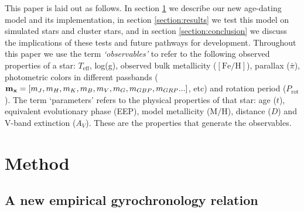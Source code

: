 \documentclass[useAMS, usenatbib, preprint, 12pt]{aastex}
\newcommand{\teff}{$T_{\mathrm{eff}}$}
\newcommand{\logg}{log(g)}
\begin{document}
This paper is laid out as follows.
In section \ref{section:method} we describe our new age-dating model and its
implementation, in section \ref{section:results} we test this model on
simulated stars and cluster stars, and in section \ref{section:conclusion} we
discuss the implications of these tests and future pathways for development.
Throughout this paper we use the term {\it `observables'} to refer to the
following observed properties of a star: \teff, \logg, observed bulk
metallicity ($[\mathrm{Fe/H}]$), parallax ($\bar{\pi}$), photometric
colors in different passbands (${\bf m_x} = [m_J, m_H, m_K, m_B, m_V, m_G,
m_{GBP}, m_{GRP}...]$, etc) and rotation period ($P_{\mathrm{rot}}$).
The term `parameters' refers to the physical properties of that star: age
($t$), equivalent evolutionary phase (EEP), model metallicity
($\mathrm{M/H}$), distance ($D$) and V-band extinction ($A_V$).
These are the properties that generate the observables.

% 

\section{Method}
\label{section:method}
\subsection{A new empirical gyrochronology relation}
\end{document}
